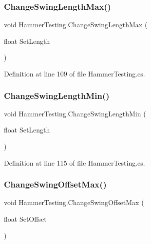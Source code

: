 \subsubsection{\texorpdfstring{Change\+Swing\+Length\+Max()}{ChangeSwingLengthMax()}}
{\footnotesize\ttfamily void Hammer\+Testing.\+Change\+Swing\+Length\+Max (\begin{DoxyParamCaption}\item[{float}]{Set\+Length }\end{DoxyParamCaption})}



Definition at line 109 of file Hammer\+Testing.\+cs.

\mbox{\label{class_hammer_testing_a02e37ef618b93f28388a20cd1c0d2b99}} 
\subsubsection{\texorpdfstring{Change\+Swing\+Length\+Min()}{ChangeSwingLengthMin()}}
{\footnotesize\ttfamily void Hammer\+Testing.\+Change\+Swing\+Length\+Min (\begin{DoxyParamCaption}\item[{float}]{Set\+Length }\end{DoxyParamCaption})}



Definition at line 115 of file Hammer\+Testing.\+cs.

\mbox{\label{class_hammer_testing_ae67d42f241c31fe41be12392f08d6d9d}} 
\subsubsection{\texorpdfstring{Change\+Swing\+Offset\+Max()}{ChangeSwingOffsetMax()}}
{\footnotesize\ttfamily void Hammer\+Testing.\+Change\+Swing\+Offset\+Max (\begin{DoxyParamCaption}\item[{float}]{Set\+Offset }\end{DoxyParamCaption})}




